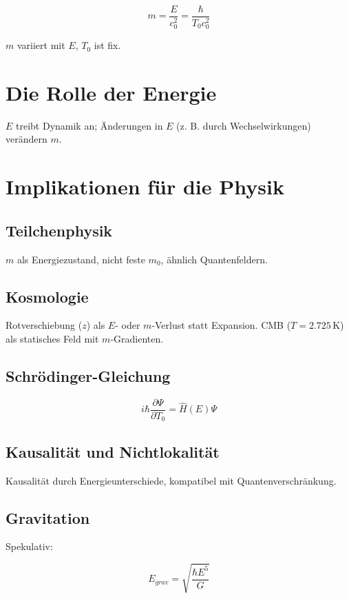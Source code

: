 \documentclass{article}
\begin{document}
	\[
	m = \frac{E}{c_0^2} = \frac{\hbar}{T_0 c_0^2}
	\]
	
	\( m \) variiert mit \( E \), \( T_0 \) ist fix.
	
	\section{Die Rolle der Energie}
	
	\( E \) treibt Dynamik an; Änderungen in \( E \) (z. B. durch Wechselwirkungen) verändern \( m \).
	
	\section{Implikationen für die Physik}
	
	\subsection{Teilchenphysik}
	
	\( m \) als Energiezustand, nicht feste \( m_0 \), ähnlich Quantenfeldern.
	
	\subsection{Kosmologie}
	
	Rotverschiebung (\( z \)) als \( E \)- oder \( m \)-Verlust statt Expansion. CMB (\( T = 2.725 \, \text{K} \)) als statisches Feld mit \( m \)-Gradienten.
	
	\subsection{Schrödinger-Gleichung}
	
	\[
	i\hbar \frac{\partial \Psi}{\partial T_0} = \hat{H}(E) \Psi
	\]
	
	\subsection{Kausalität und Nichtlokalität}
	
	Kausalität durch Energieunterschiede, kompatibel mit Quantenverschränkung.
	
	\subsection{Gravitation}
	
	Spekulativ:
	
	\[
	E_{grav} = \sqrt{\frac{\hbar E^5}{G}}
	\]
	
\end{document}

